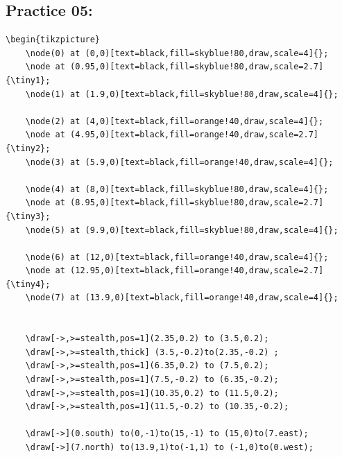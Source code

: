 \documentclass{article}
\begin{document}
		\subsection{Practice 05:}
\begin{lstlisting}
\begin{tikzpicture}
	\node(0) at (0,0)[text=black,fill=skyblue!80,draw,scale=4]{};
	\node at (0.95,0)[text=black,fill=skyblue!80,draw,scale=2.7]{\tiny1};
	\node(1) at (1.9,0)[text=black,fill=skyblue!80,draw,scale=4]{};
			
	\node(2) at (4,0)[text=black,fill=orange!40,draw,scale=4]{};
	\node at (4.95,0)[text=black,fill=orange!40,draw,scale=2.7]{\tiny2};
	\node(3) at (5.9,0)[text=black,fill=orange!40,draw,scale=4]{};
			
	\node(4) at (8,0)[text=black,fill=skyblue!80,draw,scale=4]{};
	\node at (8.95,0)[text=black,fill=skyblue!80,draw,scale=2.7]{\tiny3};
	\node(5) at (9.9,0)[text=black,fill=skyblue!80,draw,scale=4]{};
			
	\node(6) at (12,0)[text=black,fill=orange!40,draw,scale=4]{};
	\node at (12.95,0)[text=black,fill=orange!40,draw,scale=2.7]{\tiny4};
	\node(7) at (13.9,0)[text=black,fill=orange!40,draw,scale=4]{};
			
			
	\draw[->,>=stealth,pos=1](2.35,0.2) to (3.5,0.2);
	\draw[->,>=stealth,thick] (3.5,-0.2)to(2.35,-0.2) ;
	\draw[->,>=stealth,pos=1](6.35,0.2) to (7.5,0.2);
	\draw[->,>=stealth,pos=1](7.5,-0.2) to (6.35,-0.2);
	\draw[->,>=stealth,pos=1](10.35,0.2) to (11.5,0.2);
	\draw[->,>=stealth,pos=1](11.5,-0.2) to (10.35,-0.2);
			
	\draw[->](0.south) to(0,-1)to(15,-1) to (15,0)to(7.east);
	\draw[->](7.north) to(13.9,1)to(-1,1) to (-1,0)to(0.west);
\end{lstlisting}
\end{document}
